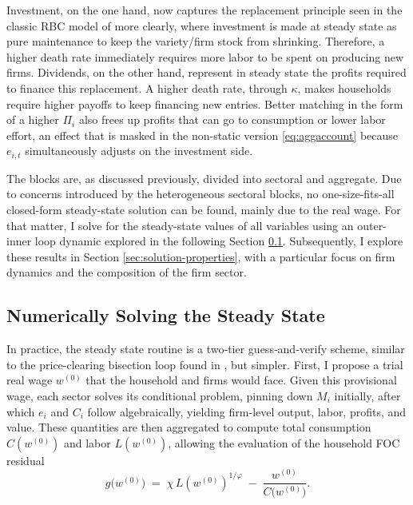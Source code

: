 \documentclass[a4paper,12pt]{article} %
\numberwithin{equation}{section} %
\numberwithin{figure}{section}
\numberwithin{table}{section}
\begin{document}
Investment, on the one hand, now captures the replacement principle seen in the classic RBC model 
of \textcite{campbell1994inspecting} more clearly, where investment is made at steady state as pure maintenance to keep the variety/firm stock from shrinking. Therefore,
a higher death rate immediately requires more labor to be spent on producing new firms. Dividends, on the other hand, represent in
steady state the profits required to finance this replacement. A higher death rate, through $\kappa$, makes households require 
higher payoffs to keep financing new entries. Better matching in the form of a higher $\Pi_i$ also frees up profits that can go to 
consumption or lower labor effort, an effect that is masked in the non-static version \eqref{eq:aggaccount} because $e_{i,t}$ 
simultaneously adjusts on the investment side.

The blocks are,
as discussed previously, divided into sectoral and aggregate. Due to concerns introduced by the heterogeneous sectoral blocks, no
one-size-fits-all closed-form steady-state solution can be found, mainly due to the real wage. For that matter, I solve for the
steady-state values of all variables using an outer-inner loop dynamic explored in the following Section \ref{sec:solution-num}.
Subsequently, I explore these results in Section \ref{sec:solution-properties}, with a particular focus on firm dynamics and the
composition of the firm sector.


\subsection{Numerically Solving the Steady State}
\label{sec:solution-num}

In practice, the steady state routine is a two‐tier guess‐and‐verify scheme, similar to the 
price-clearing bisection loop found in 
\textcite{khan2008idiosyncratic}, but simpler. 
First, I propose a trial real wage \(w^{(0)}\) that the household and firms would face. 
Given this provisional wage, each sector solves its conditional problem, pinning down \(M_i\) initially, after which $e_i$
and \(C_i\) follow algebraically, yielding firm-level output, labor, profits, and value. 
These quantities are then aggregated to compute total consumption \(C(w^{(0)})\) and labor \(L(w^{(0)})\), allowing the
evaluation of the household FOC residual
\begin{equation}
g\bigl(w^{(0)}\bigr) \;=\; \chi\,L(w^{(0)})^{1/\varphi} \;-\; \frac{w^{(0)}}{C\bigl(w^{(0)}\bigr)}. \label{bisection}
\end{equation}
\end{document}
